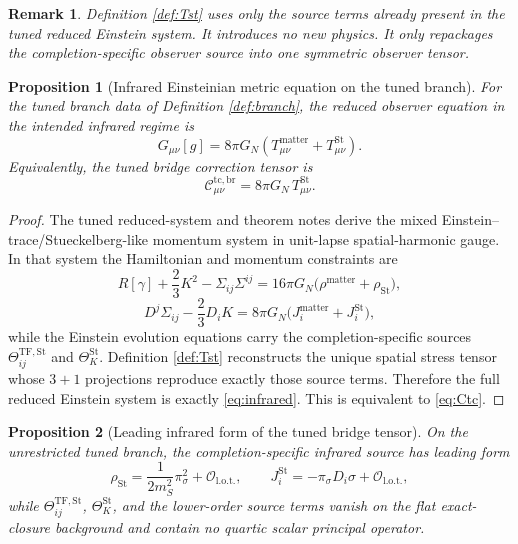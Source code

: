 \documentclass[11pt]{article}
\newtheorem{proposition}{Proposition}
\newtheorem{remark}{Remark}
\begin{document}
\begin{remark}
Definition \ref{def:Tst} uses only the source terms already present in the tuned reduced Einstein system. It introduces no new physics. It only repackages the completion-specific observer source into one symmetric observer tensor.
\end{remark}

\begin{proposition}[Infrared Einsteinian metric equation on the tuned branch]
\label{prop:infrared}
For the tuned branch data of Definition \ref{def:branch}, the reduced observer equation in the intended infrared regime is
\begin{equation}
G_{\mu\nu}[g]
=
8\pi G_N\left(
T_{\mu\nu}^{\mathrm{matter}}
+T_{\mu\nu}^{\mathrm{St}}
\right).
\label{eq:infrared}
\end{equation}
Equivalently, the tuned bridge correction tensor is
\begin{equation}
\mathcal C_{\mu\nu}^{\mathrm{tc,br}}
=
8\pi G_N\,T_{\mu\nu}^{\mathrm{St}}.
\label{eq:Ctc}
\end{equation}
\end{proposition}

\begin{proof}
The tuned reduced-system and theorem notes derive the mixed Einstein--trace/Stueckelberg-like momentum system in unit-lapse spatial-harmonic gauge. In that system the Hamiltonian and momentum constraints are
\[
R[\gamma]+\frac23K^2-\Sigma_{ij}\Sigma^{ij}
=
16\pi G_N\bigl(\rho^{\mathrm{matter}}+\rho_{\mathrm{St}}\bigr),
\]
\[
D^j\Sigma_{ij}-\frac23D_iK
=
8\pi G_N\bigl(J_i^{\mathrm{matter}}+J_i^{\mathrm{St}}\bigr),
\]
while the Einstein evolution equations carry the completion-specific sources \(\Theta_{ij}^{\mathrm{TF,St}}\) and \(\Theta_K^{\mathrm{St}}\). Definition \ref{def:Tst} reconstructs the unique spatial stress tensor whose \(3+1\) projections reproduce exactly those source terms. Therefore the full reduced Einstein system is exactly \eqref{eq:infrared}. This is equivalent to \eqref{eq:Ctc}.
\end{proof}

\begin{proposition}[Leading infrared form of the tuned bridge tensor]
\label{prop:leading}
On the unrestricted tuned branch, the completion-specific infrared source has leading form
\begin{equation}
\rho_{\mathrm{St}}
=
\frac{1}{2m_S^2}\pi_\sigma^2+\mathcal O_{\mathrm{l.o.t.}},
\qquad
J_i^{\mathrm{St}}
=
-\pi_\sigma D_i\sigma+\mathcal O_{\mathrm{l.o.t.}},
\label{eq:leading}
\end{equation}
while \(\Theta_{ij}^{\mathrm{TF,St}}\), \(\Theta_K^{\mathrm{St}}\), and the lower-order source terms vanish on the flat exact-closure background and contain no quartic scalar principal operator.
\end{proposition}
\end{document}

